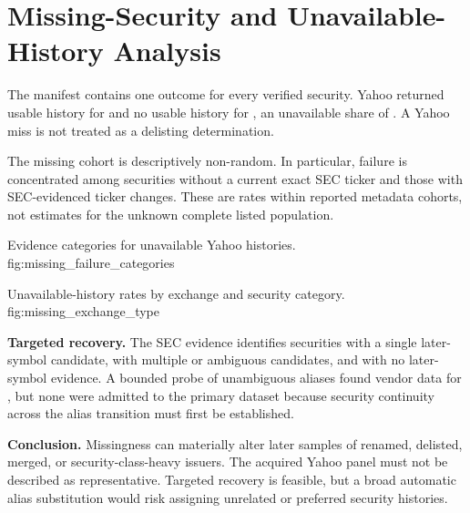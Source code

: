 \section{Missing-Security and Unavailable-History Analysis}

The manifest contains one outcome for every verified security. Yahoo returned
usable history for \YahooSuccess{} and no usable history for
\UnavailableSecurities{}, an unavailable share of \UnavailableShare{}. A Yahoo
miss is not treated as a delisting determination.


The missing cohort is descriptively non-random. In particular, failure is
concentrated among securities without a current exact SEC ticker and those with
SEC-evidenced ticker changes. These are rates within reported metadata cohorts,
not estimates for the unknown complete listed population.


  {Evidence categories for unavailable Yahoo histories.}
  {fig:missing_failure_categories}

  {Unavailable-history rates by exchange and security category.}
  {fig:missing_exchange_type}

\textbf{Targeted recovery.} The SEC evidence identifies
\SafeAliasCandidates{} securities with a single later-symbol candidate,
\AmbiguousAliasCandidates{} with multiple or ambiguous candidates, and
\MissingNoAlias{} with no later-symbol evidence. A bounded probe of
\ProbeAttempts{} unambiguous aliases found vendor data for \ProbeFound{}, but
none were admitted to the primary dataset because security continuity across
the alias transition must first be established.

\textbf{Conclusion.} Missingness can materially alter later samples of renamed,
delisted, merged, or security-class-heavy issuers. The acquired Yahoo panel must
not be described as representative. Targeted recovery is feasible, but a broad
automatic alias substitution would risk assigning unrelated or preferred
security histories.
